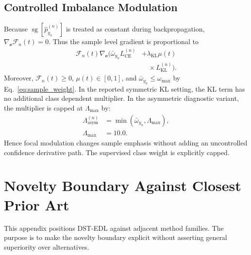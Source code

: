 \documentclass[letterpaper]{article}
\begin{document}
\subsection{Controlled Imbalance Modulation}
Because $\operatorname{sg}[\hat{p}_{y_n}^{(n)}]$ is treated as constant during backpropagation, $\nabla_{\bm{e}}\mathcal{F}_n(t)=0$. Thus the sample level gradient is proportional to
\begin{equation}
\begin{aligned}
    \mathcal F_n(t)\nabla_{\bm e}\!\bigl(
    \bar\omega_{y_n}L_{\mathrm{CE}}^{(n)}
    &+\lambda_{\mathrm{KL}}\mu(t)\\
    &\quad\times L_{\mathrm{KL}}^{(n)}\bigr).
\end{aligned}
\end{equation}
Moreover, $\mathcal{F}_n(t)\ge0$, $\mu(t)\in[0,1]$, and $\bar{\omega}_{y_n}\le\omega_{\max}$ by Eq.~\ref{eq:sample_weight}. In the reported symmetric KL setting, the KL term has no additional class dependent multiplier. In the asymmetric diagnostic variant, the multiplier is capped at $\Lambda_{\max}$ by:
\begin{equation}\label{eq:asym_multiplier}
\begin{aligned}
    \Lambda_{\mathrm{asym}}^{(n)}
    &=\min(\bar\omega_{y_n},\Lambda_{\max}),\\
    \Lambda_{\max}&=10.0.
\end{aligned}
\end{equation}
Hence focal modulation changes sample emphasis without adding an uncontrolled confidence derivative path. The supervised class weight is explicitly capped.

\section{Novelty Boundary Against Closest Prior Art}
\label{app:novelty}
This appendix positions DST-EDL against adjacent method families. The purpose
is to make the novelty boundary explicit without asserting general superiority
over alternatives.
\end{document}
